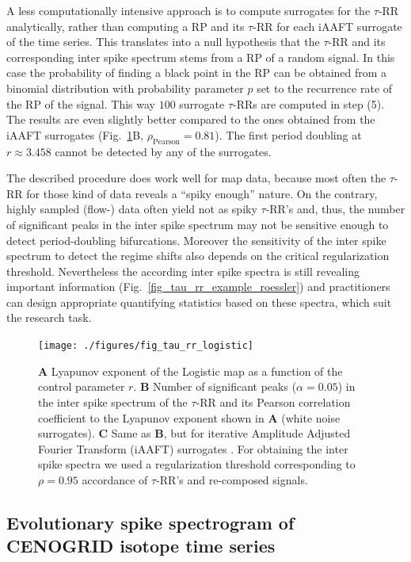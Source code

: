 A less computationally intensive approach is to compute surrogates for the $\tau$-RR analytically, rather than computing a RP and its $\tau$-RR for each iAAFT surrogate of the 
time series. This translates into a null hypothesis 
that the $\tau$-RR and its corresponding inter spike spectrum stems from a RP of a random signal. In this case the probability of finding a black point in the RP can be obtained 
from a binomial distribution with probability parameter $p$ set to the recurrence rate of the RP of the signal. This way $100$ surrogate $\tau$-RRs are computed in step (5). 
The results are even slightly better compared to the ones obtained from the iAAFT surrogates (Fig.~\ref{fig_tau_rr_logistic}B, $\rho_{\text{Pearson}}=0.81$). The first period doubling at 
$r \approx 3.458$ cannot be detected by any of the surrogates.

The described procedure does work well for map data, because most often the $\tau$-RR for those kind of data reveals a ``spiky enough'' nature. 
On the contrary, highly sampled (flow-) data often yield not as 
spiky $\tau$-RR's and, thus, the number of significant peaks in the inter spike spectrum may not be sensitive enough to detect period-doubling bifurcations. Moreover the sensitivity of the 
inter spike spectrum to detect the regime shifts also depends on the critical regularization threshold. Nevertheless the 
according inter spike spectra is still revealing important information (Fig.~\ref{fig_tau_rr_example_roessler}) and practitioners can design appropriate quantifying statistics based 
on these spectra, which suit the 
research task.

\begin{figure}
 \centering
 \texttt{[image: ./figures/fig\_tau\_rr\_logistic]}
 \caption{\textbf{A} Lyapunov exponent of the Logistic map as a function of the control parameter $r$. 
 \textbf{B} Number of significant peaks ($\alpha=0.05$) in the inter spike spectrum of the $\tau$-RR and its Pearson correlation coefficient to the Lyapunov exponent shown in \textbf{A} 
 (white noise surrogates). 
 \textbf{C} Same as \textbf{B}, but for iterative Amplitude Adjusted Fourier Transform (iAAFT) surrogates \cite{Schreiber1996,Schreiber2000}. For obtaining the inter spike spectra we used 
 a regularization threshold corresponding to $\rho=0.95$ accordance of $\tau$-RR's and re-composed signals.  
}
\label{fig_tau_rr_logistic}
\end{figure}

\subsection{Evolutionary spike spectrogram of CENOGRID isotope time series}

